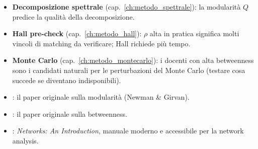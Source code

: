 \begin{connessionebox}
\begin{itemize}
\item \textbf{Decomposizione spettrale}
  (cap.~\ref{ch:metodo_spettrale}): la modularit\`a $Q$
  predice la qualit\`a della decomposizione.
\item \textbf{Hall pre-check} (cap.~\ref{ch:metodo_hall}):
  $\rho$ alta in pratica significa molti vincoli di
  matching da verificare; Hall richiede pi\`u tempo.
\item \textbf{Monte Carlo} (cap.~\ref{ch:metodo_montecarlo}):
  i docenti con alta betweenness sono i candidati naturali
  per le perturbazioni del Monte Carlo (testare cosa
  succede se diventano indisponibili).
\end{itemize}
\end{connessionebox}

\begin{biblioparvabox}
\begin{itemize}
\item \cite{newman2004}: il paper originale sulla
  modularit\`a (Newman \& Girvan).
\item \cite{freeman1977}: il paper originale sulla
  betweenness.
\item \cite{newman2010}: \emph{Networks: An
  Introduction}, manuale moderno e accessibile per la
  network analysis.
\end{itemize}
\end{biblioparvabox}
